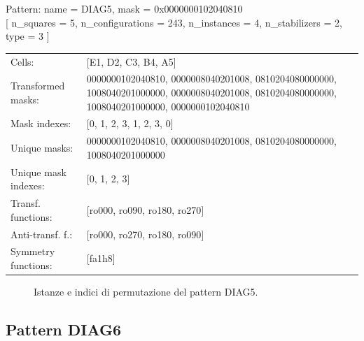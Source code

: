 \begin{tcolorbox}[sharp corners, fontupper=\ttfamily\small, colback=white]
  \noindent Pattern: name = DIAG5, mask = 0x0000000102040810\\
  {[} n\_squares = 5, n\_configurations = 243,
  n\_instances = 4, n\_stabilizers = 2, type = 3 { ]}\\[1.0ex]
  \begin{tabularx}{\textwidth}{@{} p{3.5cm} X @{}}
    Cells:               & {[}E1, D2, C3, B4, A5{]}\\[0.5ex]
    Transformed masks:   & 0000000102040810, 0000008040201008, 0810204080000000, 1008040201000000, 0000008040201008, 0810204080000000, 1008040201000000, 0000000102040810\\[0.5ex]
    Mask indexes:        & {[}0, 1, 2, 3, 1, 2, 3, 0{]}\\[0.5ex]
    Unique masks:        & 0000000102040810, 0000008040201008, 0810204080000000, 1008040201000000\\[0.5ex]
    Unique mask indexes: & {[}0, 1, 2, 3{]}\\[0.5ex]
    Transf. functions:   & {[}ro000, ro090, ro180, ro270{]}\\[0.5ex]
    Anti-transf. f.:     & {[}ro000, ro270, ro180, ro090{]}\\[0.5ex]
    Symmetry functions:  & {[}fa1h8{]}\\[0.5ex]
  \end{tabularx}
\end{tcolorbox}

\begin{figure}[htbp]
  \centering
   \hfill
   \hfill
   \hfill
  \vspace{0.3cm}
   \hfill
   \hfill
   \hfill
  \caption{Istanze e indici di permutazione del pattern DIAG5.}
\end{figure}

\newpage

\subsection{Pattern DIAG6}


